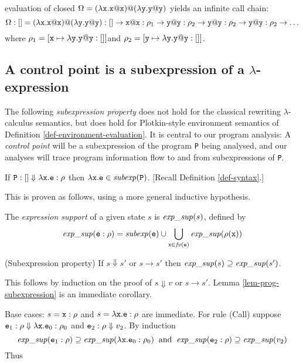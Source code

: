 \documentclass{LMCS}
\newcommand{\fl}{\noindent}
\newcommand{\hair}{\hspace{2mm}}
\newcommand{\bdfn}{\begin{defi}}
\newcommand{\edfn}{\end{defi}}
\newcommand{\blem}{\begin{lem}}
\newcommand{\elem}{\end{lem}}
\newcommand{\bprf}{\proof}
\theoremstyle{definition}\newtheorem{env}[thm]{Environment}
\begin{document}
\medskip


\fl{\em Example:} evaluation of closed 
$\Omega=(\lambda{\tt x.x@x}){\tt@}(\lambda{\tt y.y@y})$ 
yields an infinite call chain:
$$
\Omega:[]=(\lambda{\tt x.x@x}){\tt@}(\lambda{\tt y.y@y}):[]\to
{\tt x@x}:\rho_1\to
  {\tt y@y}:\rho_2\to{\tt y@y}:\rho_2\to{\tt y@y}:\rho_2\to\ldots
$$
where $\rho_1=[{\tt x}\mapsto\lambda{\tt y.y@y}:[]]$\hair and \hair
	      $\rho_2=[{\tt y}\mapsto\lambda{\tt y.y@y}:[]]$.	      







\subsection{A control point is a subexpression of a $\lambda$-expression}

The following {\em subexpression property} 
does not hold for the classical rewriting $\lambda$-calculus 
semantics, but does hold for Plotkin-style environment semantics of 
Definition \ref{def-environment-evaluation}. It is central to our program 
analysis: A {\em control point} will be a
subexpression of the program {\tt P} being analysed, and our analyses will trace 
program information flow to and from subexpressions of {\tt P}.


\blem \label{lem-prog-subexpression}
If 
${\tt P}:[]\Downarrow \lambda{\tt x.e}:\rho$ then 
$\lambda{\tt x.e}\in{\it subexp}({\tt P})$. {\rm [Recall Definition \ref{def-syntax}.]}
\elem
This is proven as follows, using a more general inductive hypothesis.

\bdfn The {\em expression support} of a given state $s$ is
 ${\it exp\_sup}(s)$, defined by
\[{\it exp\_sup}({\tt e}:\rho) = {\it subexp}({\tt e}) \cup  
  \bigcup_{{\tt x}\in{\it fv}({\tt e})}
     {\it exp\_sup}(\rho({\tt x}))
     \]
\edfn

\blem \label{lem-subexpression} 
{\rm (Subexpression property)} If $s\Downarrow s'$ or $s\to s'$ then
${\it exp\_sup}(s)\supseteq {\it exp\_sup}(s')$. 
\elem


\bprf 
This follows by induction on the proof of 
 $s\Downarrow v$ or $s\to s'$. Lemma \ref{lem-prog-subexpression} is 
 an immediate corollary.


Base cases: $s={\tt x}:\rho$ and $s=\lambda{\tt x.e}:\rho$ 
 are immediate.
 For rule (Call)  suppose 
 ${\tt e}_1:\rho\Downarrow \lambda{\tt x.e}_0:\rho_0$ and
 ${\tt e}_2:\rho\Downarrow v_2$. By induction
$${\it exp\_sup}({\tt e}_1:\rho)\supseteq
  {\it exp\_sup}(\lambda{\tt x.e}_0:\rho_0)
  \mbox{\hair and\hair}{\it exp\_sup}({\tt e}_2:\rho)\supseteq
  {\it exp\_sup}(v_2)$$
Thus
\end{document}
